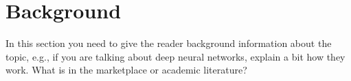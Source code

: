 \section{Background}\label{sec:background}

In this section you need to give the reader background information about the topic, 
e.g., if you are talking about deep neural networks, explain a bit how they work. What is in the marketplace or academic literature?